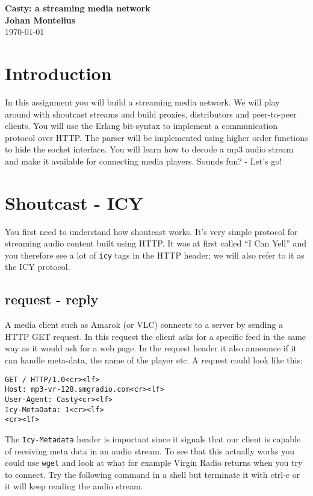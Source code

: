 \documentclass[a4paper,11pt]{article}
\newcommand{\nnsection}[1]{
\section*{#1}
\addcontentsline{toc}{section}{#1}
}
\begin{document}
\begin{center}
\vspace{20pt}
\textbf{\large Casty: a streaming media network}\\
\vspace{10pt}
\textbf{Johan Montelius}\\
\vspace{10pt}
\today{}
\end{center}

\nnsection{Introduction}

In this assignment you will build a streaming media network. We will
play around with shoutcast streams and build proxies, distributors and
peer-to-peer clients. You will use the Erlang bit-syntax to implement
a communication protocol over HTTP. The parser will be implemented
using higher order functions to hide the socket interface. You will
learn how to decode a mp3 audio stream and make it available for
connecting media players. Sounds fun? - Let's go!

\section{Shoutcast - ICY}

You first need to understand how shoutcast works. It's very simple
protocol for streaming audio content built using HTTP. It was at first
called ``I Can Yell'' and you therefore see a lot of {\tt icy} tags in
the HTTP header; we will also refer to it as the ICY protocol. 

\subsection{request - reply}

A media client such as Amarok (or VLC) connects to a server by sending a HTTP
GET request. In this request the client asks for a specific feed in the
same way as it would ask for a web page. In the request header it also
announce if it can handle meta-data, the name of the player etc. A
request could look like this:


\begin{verbatim}
GET / HTTP/1.0<cr><lf>
Host: mp3-vr-128.smgradio.com<cr><lf>
User-Agent: Casty<cr><lf>
Icy-MetaData: 1<cr><lf>
<cr><lf>
\end{verbatim}


The {\tt Icy-Metadata} header is important since it signals that our
client is capable of receiving meta data in an audio stream. To see that
this actually works you could use {\tt wget} and look at what for
example Virgin Radio returns when you try to connect. Try the
following command in a shell but terminate it with ctrl-c or it will
keep reading the audio stream.
\end{document}
